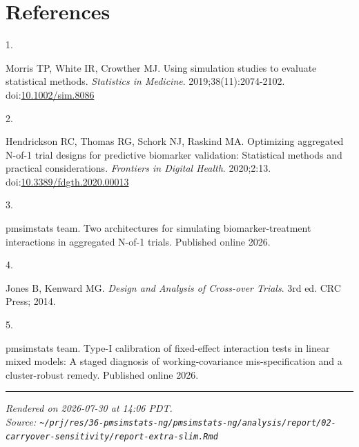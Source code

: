 \documentclass[
  11pt,
]{article}
\newlength{\cslhangindent}
\newlength{\csllabelwidth}
\newenvironment{CSLReferences}[2] %
 {\begin{list}{}{%
  \setlength{\itemindent}{0pt}
  \setlength{\leftmargin}{0pt}
  \setlength{\parsep}{0pt}
  \ifodd #1
   \setlength{\leftmargin}{\cslhangindent}
   \setlength{\itemindent}{-1\cslhangindent}
  \fi
  \setlength{\itemsep}{#2\baselineskip}}}
 {\end{list}}
\newcommand{\CSLLeftMargin}[1]{\parbox[t]{\csllabelwidth}{\strut#1\strut}}
\newcommand{\CSLRightInline}[1]{\parbox[t]{\linewidth - \csllabelwidth}{\strut#1\strut}}
\begin{document}
\section{References}\label{references}

\protect{}\label{refs}
\begin{CSLReferences}{0}{1}
\CSLLeftMargin{1. }%
\CSLRightInline{Morris TP, White IR, Crowther MJ. Using simulation studies to evaluate statistical methods. \emph{Statistics in Medicine}. 2019;38(11):2074-2102. doi:\href{https://doi.org/10.1002/sim.8086}{10.1002/sim.8086}}

\CSLLeftMargin{2. }%
\CSLRightInline{Hendrickson RC, Thomas RG, Schork NJ, Raskind MA. Optimizing aggregated {N}-of-1 trial designs for predictive biomarker validation: Statistical methods and practical considerations. \emph{Frontiers in Digital Health}. 2020;2:13. doi:\href{https://doi.org/10.3389/fdgth.2020.00013}{10.3389/fdgth.2020.00013}}

\CSLLeftMargin{3. }%
\CSLRightInline{{pmsimstats team}. Two architectures for simulating biomarker-treatment interactions in aggregated {N}-of-1 trials. Published online 2026.}

\CSLLeftMargin{4. }%
\CSLRightInline{Jones B, Kenward MG. \emph{Design and Analysis of Cross-over Trials}. 3rd ed. CRC Press; 2014.}

\CSLLeftMargin{5. }%
\CSLRightInline{{pmsimstats team}. Type-{I} calibration of fixed-effect interaction tests in linear mixed models: A staged diagnosis of working-covariance mis-specification and a cluster-robust remedy. Published online 2026.}

\end{CSLReferences}

\vfill

\begin{center}\rule{0.5\linewidth}{0.5pt}\end{center}

\emph{Rendered on 2026-07-30 at 14:06 PDT.}\\
\emph{Source: \texttt{\textasciitilde{}/prj/res/36-pmsimstats-ng/pmsimstats-ng/analysis/report/02-carryover-sensitivity/report-extra-slim.Rmd}}
\end{document}
